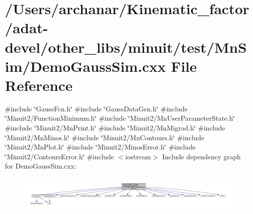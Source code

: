 \hypertarget{adat-devel_2other__libs_2minuit_2test_2MnSim_2DemoGaussSim_8cxx}{}\section{/\+Users/archanar/\+Kinematic\+\_\+factor/adat-\/devel/other\+\_\+libs/minuit/test/\+Mn\+Sim/\+Demo\+Gauss\+Sim.cxx File Reference}
\label{adat-devel_2other__libs_2minuit_2test_2MnSim_2DemoGaussSim_8cxx}
{\ttfamily \#include \char`\"{}Gauss\+Fcn.\+h\char`\"{}}\newline
{\ttfamily \#include \char`\"{}Gauss\+Data\+Gen.\+h\char`\"{}}\newline
{\ttfamily \#include \char`\"{}Minuit2/\+Function\+Minimum.\+h\char`\"{}}\newline
{\ttfamily \#include \char`\"{}Minuit2/\+Mn\+User\+Parameter\+State.\+h\char`\"{}}\newline
{\ttfamily \#include \char`\"{}Minuit2/\+Mn\+Print.\+h\char`\"{}}\newline
{\ttfamily \#include \char`\"{}Minuit2/\+Mn\+Migrad.\+h\char`\"{}}\newline
{\ttfamily \#include \char`\"{}Minuit2/\+Mn\+Minos.\+h\char`\"{}}\newline
{\ttfamily \#include \char`\"{}Minuit2/\+Mn\+Contours.\+h\char`\"{}}\newline
{\ttfamily \#include \char`\"{}Minuit2/\+Mn\+Plot.\+h\char`\"{}}\newline
{\ttfamily \#include \char`\"{}Minuit2/\+Minos\+Error.\+h\char`\"{}}\newline
{\ttfamily \#include \char`\"{}Minuit2/\+Contours\+Error.\+h\char`\"{}}\newline
{\ttfamily \#include $<$iostream$>$}\newline
Include dependency graph for Demo\+Gauss\+Sim.\+cxx\+:
\nopagebreak
\begin{figure}[H]
\begin{center}
\leavevmode
\includegraphics[width=350pt]{da/de4/adat-devel_2other__libs_2minuit_2test_2MnSim_2DemoGaussSim_8cxx__incl}
\end{center}
\end{figure}
